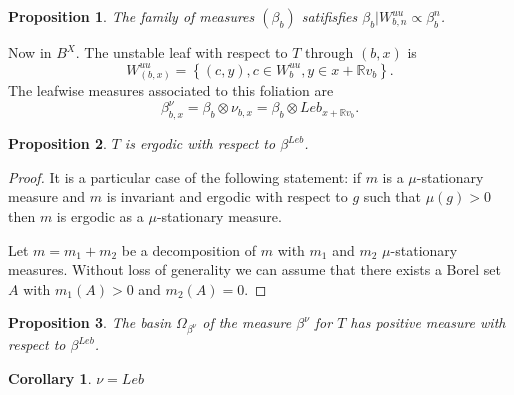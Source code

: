 \documentclass[11pt]{article}
\newtheorem{prop}{Proposition}[section]
\newtheorem{cor}{Corollary}[section]
\newcommand{\R}{\mathbb{R}}
\begin{document}
\begin{prop}
	The family of measures
	$ (\beta_{b})  $
	satifisfies
	$ \beta_{b}{| W^{uu}_{b,n} }
	\propto
	\beta_{b}^{n} $.
\end{prop}

Now in $ B^X $.
The unstable leaf with respect to $ T $
through
$ (b,x) $ is
\begin{equation}
	W^{uu}_{(b,x)}
	=
	\left\{ 
		(c, y),
		c \in W^{uu}_{b},
		y \in x + \R v_{b}
	\right\}
	.
\end{equation}
The leafwise measures associated
to this foliation are
\begin{equation}
	\beta^{\nu}_{b,x}
	=
	\beta_{b}
	\otimes
	\nu_{b,x}
	=
	\beta_{b}
	\otimes
	Leb_{x + \R v_{b}} 
	.
\end{equation}

\begin{prop}
	$ T $ is ergodic
	with respect to
	$ \beta^{Leb} $.
\end{prop}
\begin{proof}
	It is a particular case of the following statement:
	if $ m $ is a $ \mu $-stationary measure and
	$ m $ is invariant and ergodic with respect to
	$ g $ such that $ \mu(g) > 0 $ then
	$ m $ is ergodic as a $ \mu $-stationary measure.

	Let $ m = m_{1} + m_{2} $ be a decomposition
	of $ m $ with $ m_1 $ and $ m_{2} $ $ \mu $-stationary measures.
	Without loss of generality we can assume that there exists
	a Borel set $ A $ with $ m_{1}(A) > 0 $ and
	$ m_{2}(A) = 0 $.
\end{proof}

\begin{prop}
	The basin
	$ \Omega_{\beta^{\nu}} $ 
	of the measure
	$ \beta^{\nu} $
	for $ T $
	has positive measure with respect to
	$ \beta^{Leb} $.
\end{prop}

\begin{cor}
	$ \nu = Leb $ 
\end{cor}





% 
% 
\end{document}
